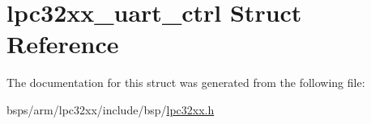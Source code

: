 \hypertarget{structlpc32xx__uart__ctrl}{}\section{lpc32xx\+\_\+uart\+\_\+ctrl Struct Reference}
\label{structlpc32xx__uart__ctrl}


The documentation for this struct was generated from the following file\+:\begin{DoxyCompactItemize}
\item 
bsps/arm/lpc32xx/include/bsp/\mbox{\hyperlink{lpc32xx_8h}{lpc32xx.\+h}}\end{DoxyCompactItemize}
